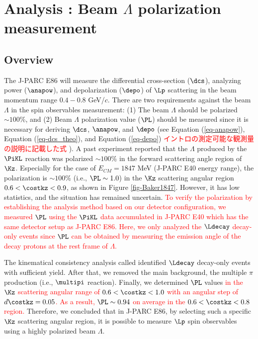 %
\graphicspath{{./pictures/chapter_Pl/}}

\chapter{Analysis : Beam $\Lambda$ polarization measurement} 
\label{chap-Pl}

\section{Overview}

The J-PARC E86 will measure the differential cross-section ($\dcs$), analyzing power ($\anapow$), and depolarization ($\depo$) of $\Lp$ scattering in the beam momentum range $0.4-0.8$ GeV/$c$. There are two requirements against the beam $\Lambda$ in the spin observables measurement: (1) The beam $\Lambda$ should be polarized $\sim100$\%, and (2) Beam $\Lambda$ polarization value ($\PL$) should be measured since it is necessary for deriving $\dcs$, $\anapow$, and $\depo$ (see Equation (\ref{eq-anapow}), Equation (\ref{eq-dcs_theo}), and Equation (\ref{eq-depo}) \textcolor{red}{ イントロの測定可能な観測量の説明に記載した式 }). A past experiment \cite{Baker} reported that the $\Lambda$ produced by the $\PiKL$ reaction was polarized $\sim100$\% in the forward scattering angle region of $\Kz$. Especially for the case of $E_{CM}=1847$ MeV (J-PARC E40 energy range), the polarization is $\sim100$\% (i.e., $\PL\sim1.0$) in the $\Kz$ scattering angular region $0.6<\costkz<0.9$, as shown in Figure \ref{fig-Baker1847}. However, it has low statistics, and the situation has remained uncertain. \textcolor{red}{ To verify the polarization by establishing the analysis method based on our detector configuration, we measured $\PL$ using the $\PiKL$ data accumulated in J-PARC E40 which has the same detector setup as J-PARC E86. Here, we only analyzed the $\Ldecay$ decay-only events since $\PL$ can be obtained by measuring the emission angle of the decay protons at the \textcolor{red}{ rest frame } of $\Lambda$. }

The kinematical consistency analysis called  identified $\Ldecay$ decay-only events with sufficient yield. After that, we removed the main background, the multiple $\pi$ production (i.e., $\multipi$ reaction). Finally, we determined $\PL$ values \textcolor{red}{ in the $\Kz$ scattering angular range of $0.6<\costkz<1.0$ with an angular step of $d\costkz=0.05$. As a result, $\PL\sim0.94$ on average in the $0.6<\costkz<0.8$ region. } Therefore, we concluded that in J-PARC E86, by selecting such a specific $\Kz$ scattering angular region, it is possible to measure $\Lp$ spin observables using a highly polarized beam $\Lambda$.

